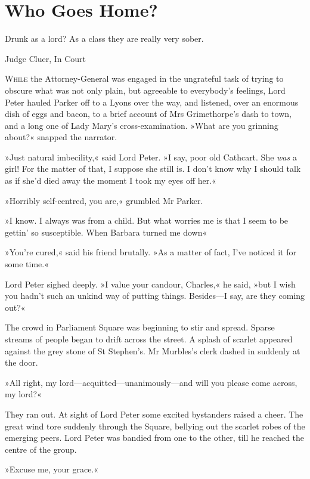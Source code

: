 
\chapter{Who Goes Home?}

\epigraph{Drunk as a lord? As a class they are really very sober.}{Judge Cluer, In Court}


\lettrine[lines=4]{W}{hile} the Attorney-General was engaged in the ungrateful task of trying to obscure what was not only plain, but agreeable to everybody's feelings, Lord Peter hauled Parker off to a Lyons over the way, and listened, over an enormous dish of eggs and bacon, to a brief account of Mrs Grimethorpe's dash to town, and a long one of Lady Mary's cross-examination.
»What are you grinning about?« snapped the narrator.

»Just natural imbecility,« said Lord Peter. »I say, poor old Cathcart.  She \textit{was} a girl! For the matter of that, I suppose she still is. I don't know why I should talk as if she'd died away the moment I took my eyes off her.«

»Horribly self-centred, you are,« grumbled Mr Parker.

»I know. I always was from a child. But what worries me is that I seem to be gettin' so susceptible. When Barbara turned me down\longdash«

»You're cured,« said his friend brutally. »As a matter of fact, I've noticed it for some time.«

Lord Peter sighed deeply. »I value your candour, Charles,« he said, »but I wish you hadn't such an unkind way of putting things. Besides\allowbreak---\allowbreak I say, are they coming out?«

The crowd in Parliament Square was beginning to stir and spread. Sparse streams of people began to drift across the street. A splash of scarlet appeared against the grey stone of St Stephen's. Mr Murbles's clerk dashed in suddenly at the door.

»All right, my lord\allowbreak---\allowbreak acquitted---unanimously\allowbreak---\allowbreak and will you please come across, my lord?«

They ran out. At sight of Lord Peter some excited bystanders raised a cheer. The great wind tore suddenly through the Square, bellying out the scarlet robes of the emerging peers. Lord Peter was bandied from one to the other, till he reached the centre of the group.

»Excuse me, your grace.«

